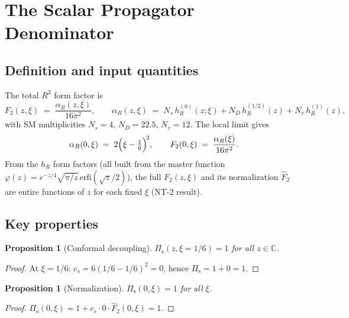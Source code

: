 \documentclass[11pt,a4paper]{article}
\newcommand{\Pis}{\Pi_{\mathrm{s}}}
\newcommand{\Fhat}{\hat{F}}
\newtheorem{proposition}[theorem]{Proposition}
\begin{document}
\section{The Scalar Propagator Denominator}
\label{sec:propagator}

\subsection{Definition and input quantities}

The total $R^2$ form factor is
\begin{equation}
  F_2(z,\xi) \;=\; \frac{\alpha_R(z,\xi)}{16\pi^2},
  \qquad
  \alpha_R(z,\xi) \;=\; N_s\,h_R^{(0)}(z;\xi) + N_D\,h_R^{(1/2)}(z)
    + N_v\,h_R^{(1)}(z),
\end{equation}
with SM multiplicities $N_s = 4$, $N_D = 22.5$, $N_v = 12$.
The local limit gives
\begin{equation}
  \alpha_R(0,\xi) \;=\; 2\Bigl(\xi - \tfrac{1}{6}\Bigr)^{\!2},
  \qquad
  F_2(0,\xi) \;=\; \frac{\alpha_R(\xi)}{16\pi^2}.
\end{equation}
From the $h_R$ form factors (all built from the master function
$\varphi(z) = e^{-z/4}\sqrt{\pi/z}\,\mathrm{erfi}(\sqrt{z}/2)$),
the full $F_2(z,\xi)$ and its normalization $\Fhat_2$ are entire
functions of $z$ for each fixed $\xi$ (NT-2 result).

\subsection{Key properties}

\begin{proposition}[Conformal decoupling]\label{prop:conformal}
  $\Pis(z,\xi=1/6) = 1$ for all $z \in \mathbb{C}$.
\end{proposition}
\begin{proof}
  At $\xi = 1/6$: $c_s = 6(1/6-1/6)^2 = 0$, hence $\Pis = 1 + 0 = 1$.
\end{proof}

\begin{proposition}[Normalization]\label{prop:normalization}
  $\Pis(0,\xi) = 1$ for all $\xi$.
\end{proposition}
\begin{proof}
  $\Pis(0,\xi) = 1 + c_s \cdot 0 \cdot \Fhat_2(0,\xi) = 1$.
\end{proof}
\end{document}
